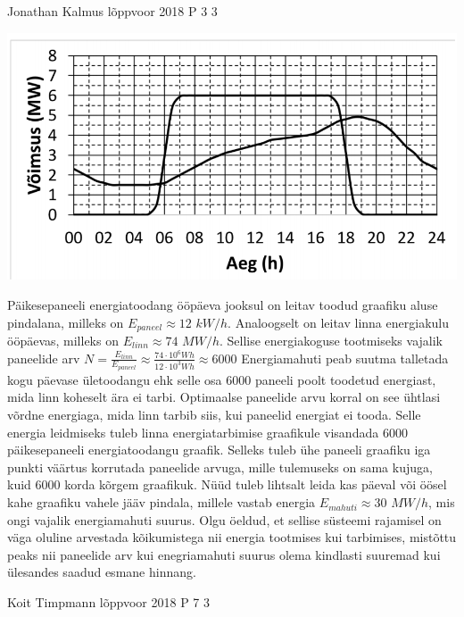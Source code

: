 \documentclass[11pt]{article}
\begin{document}
{%
{Jonathan Kalmus} %
{lõppvoor} %
{2018} %
{P 3} %
{3} %
{

\ifSolution
\begin{center}
	\includegraphics[width=0.5\linewidth]{2018-v3p-03-lah.png}
\end{center}
Päikesepaneeli energiatoodang ööpäeva jooksul on leitav toodud graafiku aluse pindalana, milleks on $E_{paneel} \approx 12$ $kW/h$. Analoogselt on leitav linna energiakulu ööpäevas, milleks on $E_{linn} \approx 74$ $MW/h$. Sellise energiakoguse tootmiseks vajalik paneelide arv $N = \frac{E_{linn}}{E_{paneel}} \approx \frac{74 \cdot 10^6Wh}{12 \cdot 10^3 Wh} \approx 6000$
Energiamahuti peab suutma talletada kogu päevase ületoodangu ehk selle osa $6000$ paneeli poolt toodetud energiast, mida linn koheselt ära ei tarbi. Optimaalse paneelide arvu korral on see ühtlasi võrdne energiaga, mida linn tarbib siis, kui paneelid energiat ei tooda. Selle energia leidmiseks tuleb linna energiatarbimise graafikule visandada $6000$ päikesepaneeli energiatoodangu graafik. Selleks tuleb ühe paneeli graafiku iga punkti väärtus korrutada paneelide arvuga, mille tulemuseks on sama kujuga, kuid $6000$ korda kõrgem graafikuk. Nüüd tuleb lihtsalt leida kas päeval või öösel kahe graafiku vahele jääv pindala, millele vastab energia $E_{mahuti} \approx 30$ $MW/h$, mis ongi vajalik energiamahuti suurus. Olgu öeldud, et sellise süsteemi rajamisel on väga oluline arvestada kõikumistega nii energia tootmises kui tarbimises, mistõttu peaks nii paneelide arv kui enegriamahuti suurus olema kindlasti suuremad kui ülesandes saadud esmane hinnang.
\fi
}

{Koit Timpmann} %
{lõppvoor} %
{2018} %
{P 7} %
{3} %
{

}}
\end{document}
